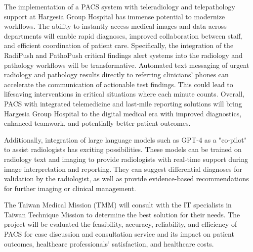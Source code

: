 \documentclass{article}
\begin{document}




The implementation of a PACS system with teleradiology and telepathology support at Hargesia Group Hospital has immense potential to modernize workflows. The ability to instantly access medical images and data across departments will enable rapid diagnoses, improved collaboration between staff, and efficient coordination of patient care. Specifically, the integration of the RadiPush and PathoPush critical findings alert systems into the radiology and pathology workflows will be transformative. Automated text messaging of urgent radiology and pathology results directly to referring clinicians' phones can accelerate the communication of actionable test findings. This could lead to lifesaving interventions in critical situations where each minute counts. 
Overall, PACS with integrated telemedicine and last-mile reporting solutions will bring Hargesia Group Hospital to the digital medical era with improved diagnostics, enhanced teamwork, and potentially better patient outcomes.


Additionally, integration of large language models such as GPT-4 as a "co-pilot" to assist radiologists has exciting possibilities. These models can be trained on radiology text and imaging to provide radiologists with real-time support during image interpretation and reporting. They can suggest differential diagnoses for validation by the radiologist, as well as provide evidence-based recommendations for further imaging or clinical management. 


The Taiwan Medical Mission (TMM) will consult with the IT specialists in Taiwan Technique Mission to determine the best solution for their needs.
The project will be evaluated the feasibility, accuracy, reliability, and efficiency of PACS for case discussion and consultation service and its impact on patient outcomes, healthcare professionals’ satisfaction, and healthcare costs.
\end{document}
